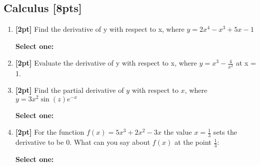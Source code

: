 \documentclass[12pt]{article}
\renewcommand{\circle}{\tikz\draw[black] (0,0) circle (1ex);}
\begin{document}
\subsection{Calculus [8pts]}
\begin{enumerate}
    \item \textbf{[2pt]} Find the derivative of y with respect to x, where $y=2x^4-x^3+5x-1$

    \textbf{Select one:}


    \item \textbf{[2pt]} Evaluate the derivative of y with respect to x, where $y = x^3 - \frac{4}{x^2}$ at x = 1.

    \begin{tcolorbox}[fit,height=1cm, width=2cm, blank, borderline={1pt}{-2pt},nobeforeafter]
    \end{tcolorbox}


    \item \textbf{[2pt]} Find the partial derivative of $y$ with respect to $x$, where $y= 3x^2 \sin(z) e^{-x}$

    \textbf{Select one:}


    \item \textbf{[2pt]} For the function $f(x)= 5x^3 +2x^2-3x$ the value $x=\frac{1}{3}$ sets the derivative to be 0. What can you say about $f(x)$ at the point $\frac{1}{3}$:

    \textbf{Select one:}


    \clearpage
\end{enumerate}
\end{document}
